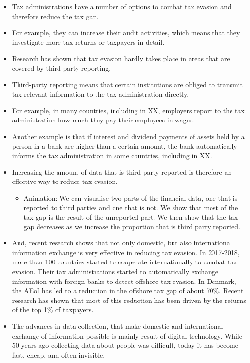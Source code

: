 \documentclass[11pt]{article}
\begin{document}
\begin{itemize}
\begin{itemize}
    \item Animation: Show visually how strong government budget would change. 
\end{itemize}
\item Tax administrations have a number of options to combat tax evasion and therefore reduce the tax gap.
\item For example, they can increase their audit activities, which means that they investigate more tax returns or taxpayers in detail.  
\item Research has shown that tax evasion hardly takes place in areas that are covered by third-party reporting.
\item Third-party reporting means that certain institutions are obliged to transmit tax-relevant information to the tax administration directly.
\item For example, in many countries, including in XX, employers report to the tax administration how much they pay their employees in wages.
\item Another example is that if interest and dividend payments of assets held by a person in a bank are higher than a certain amount, the bank automatically informs the tax administration in some countries, including in XX.
\item Increasing the amount of data that is third-party reported is therefore an effective way to reduce tax evasion.
\begin{itemize}
    \item Animation: We can visualise two parts of the financial data, one that is reported to third parties and one that is not. We show that most of the tax gap is the result of the unreported part. We then show that the tax gap decreases as we increase the proportion that is third party reported.
\end{itemize}
\item And, recent research shows that not only domestic, but also international information exchange is very effective in reducing tax evasion. In 2017-2018, more than 100 countries started to cooperate internationally to combat tax evasion. Their tax administrations started to automatically exchange information with foreign banks to detect offshore tax evasion. In Denmark, the AEoI has led to a reduction in the offshore tax gap of about 70\%. Recent research has shown that most of this reduction has been driven by the returns of the top 1\% of taxpayers.
    \item The advances in data collection, that make domestic and international exchange of information possible is mainly result of digital technology. While 50 years ago collecting data about people was difficult, today it has become fast, cheap, and often invisible.

\end{itemize}
\end{document}
